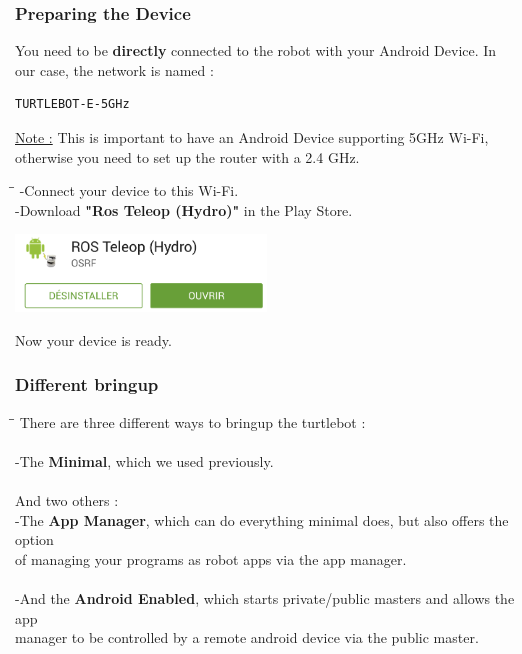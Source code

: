 \documentclass[10pt,a4paper]{article}
\begin{document}
\subsubsection{Preparing the Device}
You need to be \textbf{directly} connected to the robot with your Android Device. In our case, the network is named : 
\begin{lstlisting}[frame=single]
TURTLEBOT-E-5GHz
\end{lstlisting}

\underline{Note :} This is important to have an Android Device supporting 5GHz Wi-Fi, otherwise you need to set up the router with a 2.4 GHz.\\

\begin{tabbing}
\hspace{1cm}\=\hspace{1cm}\=\kill
\> -Connect your device to this Wi-Fi.\\
\> -Download \textbf{"Ros Teleop (Hydro)"} in the Play Store.\\
\end{tabbing}

\begin{center}
\includegraphics[width=0.5\textwidth]{images/turtlebotTeleopApp.png}
\end{center}

Now your device is ready.

\subsubsection{Different bringup}

\begin{tabbing}
\hspace{1cm}\=\hspace{1cm}\=\kill
There are three different ways to bringup the turtlebot :\\\\

\> -The \textbf{Minimal}, which we used previously.\\\\



 And two others : \\
\> -The \textbf{App Manager}, which can do everything minimal does, but also offers the option \\ of managing your programs as robot apps via the app manager.\\\\

\> -And the \textbf{Android Enabled}, which starts private/public masters and allows the app \\ manager to be controlled by a remote android device via the public master.\\\\
\end{tabbing}
\end{document}
